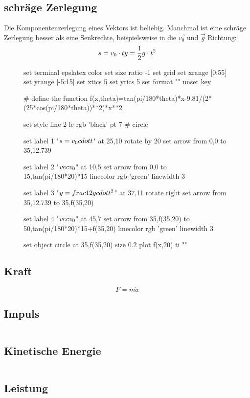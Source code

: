 \subsection{schräge Zerlegung}
Die Komponentenzerlegung eines Vektors ist beliebig. Manchmal ist eine schräge Zerlegung besser als eine Senkrechte,
beispielsweise in die $\vec{v_0}$ und $\vec{g}$ Richtung:
\newline
\[
	s=v_0 \cdot t \\
	y=\frac{1}{2}g \cdot t^2
\]
\begin{figure}[htbp]
\centering
\begin{gnuplot}[scale=0.75]
	set terminal epslatex color
	set size ratio -1
	set grid
  set xrange [0:55]
	set yrange [-5:15]
	set xtics 5
	set ytics 5
	set format ""
	unset key

  # define the function
  f(x,theta)=tan(pi/180*theta)*x-9.81/(2*(25*cos(pi/180*theta))**2)*x**2

	set style line 2 lc rgb 'black' pt 7   # circle
	
	set label 1 "$s=v_0 \\cdot t$" at 25,10 rotate by 20
	set arrow from 0,0 to 35,12.739
	
	set label 2 "$\\vec{v_0}$" at 10,5
	set arrow from 0,0 to 15,tan(pi/180*20)*15 linecolor rgb 'green' linewidth 3
	
	set label 3 "$y=\\frac{1}{2}g \\cdot t^2$" at 37,11 rotate right
	set arrow from 35,12.739 to 35,f(35,20)
	
	set label 4 "$\\vec{v_0}$" at 45,7
	set arrow from 35,f(35,20) to 50,tan(pi/180*20)*15+f(35,20) linecolor rgb 'green' linewidth 3
	
	set object circle at 35,f(35,20) size 0.2
  plot f(x,20) ti ""
	\end{gnuplot}
\end{figure}

\subsection{Kraft}
\[ F = m \dot a \]

\subsection{Impuls}
\[  \]

\subsection{Kinetische Energie}
\[  \]

\subsection{Leistung}
\[  \]

